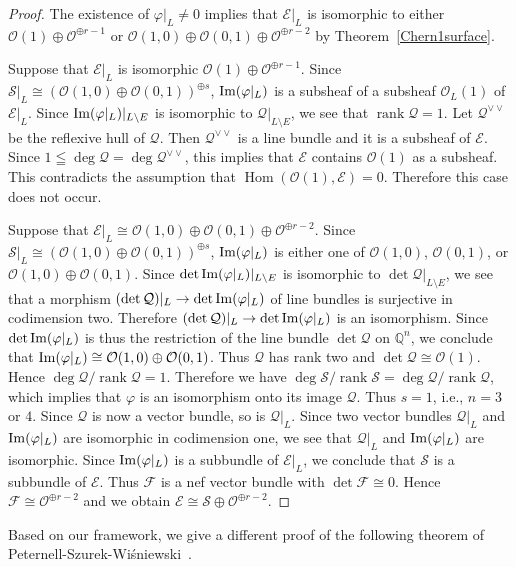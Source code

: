 \documentclass[a4paper,12pt]{amsart}
\newcommand{\im}{\mathop{\rm Im}\nolimits}
\DeclareMathOperator{\Hom}{Hom}
\DeclareMathOperator{\rk}{rank}
\begin{document}
\begin{proof}
The existence of $\varphi|_{L}\neq 0$ implies 
that $\mathcal{E}|_{L}$ is isomorphic to either $\mathcal{O}(1)\oplus \mathcal{O}^{\oplus r-1}$
or $\mathcal{O}(1,0)\oplus \mathcal{O}(0,1)\oplus \mathcal{O}^{\oplus r-2}$
by Theorem~\ref{Chern1surface}.

Suppose that 
$\mathcal{E}|_{L}$ is isomorphic $\mathcal{O}(1)\oplus \mathcal{O}^{\oplus r-1}$.
Since $\mathcal{S}|_{L}\cong (\mathcal{O}(1,0)\oplus \mathcal{O}(0,1))^{\oplus s}$,
$\im (\varphi|_{L})$ is a 
subsheaf of 
a subsheaf $\mathcal{O}_L(1)$ of $\mathcal{E}|_L$.
Since $\im (\varphi|_L)|_{L\setminus E}$ is isomorphic to $\mathcal{Q}|_{L\setminus E}$,
we see that $\rk \mathcal{Q}=1$.
Let $\mathcal{Q}^{\vee\vee}$ be the reflexive hull of $\mathcal{Q}$.
Then $\mathcal{Q}^{\vee\vee}$ is a line bundle 
and it is a subsheaf of $\mathcal{E}$.
Since 
$
1\leqq \deg\mathcal{Q}=\deg\mathcal{Q}^{\vee\vee}
$,
this implies that $\mathcal{E}$ contains $\mathcal{O}(1)$ as a subsheaf.
This contradicts the assumption that $\Hom(\mathcal{O}(1),\mathcal{E})=0$.
Therefore this case does not occur.

Suppose that 
$\mathcal{E}|_{L}
\cong 
\mathcal{O}(1,0)\oplus \mathcal{O}(0,1)\oplus \mathcal{O}^{\oplus r-2}$.
Since $\mathcal{S}|_{L}\cong (\mathcal{O}(1,0)\oplus \mathcal{O}(0,1))^{\oplus s}$,
$\im (\varphi|_{L})$ is either one of 
$\mathcal{O}(1,0)$, $\mathcal{O}(0,1)$,
or $\mathcal{O}(1,0)\oplus \mathcal{O}(0,1)$.
Since $\det \im (\varphi|_L)|_{L\setminus E}$ is isomorphic to $\det\mathcal{Q}|_{L\setminus E}$,
we see that a morphism  $(\det\mathcal{Q})|_{L}\to \det \im (\varphi|_L)$ of line bundles 
is surjective in codimension two.
Therefore $(\det\mathcal{Q})|_{L}\to \det \im (\varphi|_L)$ is an isomorphism.
Since $\det \im (\varphi|_L)$ is thus the restriction of the line bundle $\det\mathcal{Q}$ on $\mathbb{Q}^n$,
we conclude that $\im(\varphi|_{L})\cong \mathcal{O}(1,0)\oplus \mathcal{O}(0,1)$.
Thus $\mathcal{Q}$ has rank two and $\det\mathcal{Q}\cong\mathcal{O}(1)$.
Hence 
$
\deg\mathcal{Q}/\rk\mathcal{Q}=1
$.
Therefore
we have 
$
\deg\mathcal{S}/\rk\mathcal{S}= \deg\mathcal{Q}/\rk\mathcal{Q}
$,
which implies that $\varphi$ is an isomorphism onto its image $\mathcal{Q}$.
Thus $s=1$, i.e., $n=3$ or $4$.
Since $\mathcal{Q}$ is now a vector bundle, so is $\mathcal{Q}|_{L}$.
Since two vector bundles $\mathcal{Q}|_L$ and $\im (\varphi|_L)$ are isomorphic in codimension one,
we see that $\mathcal{Q}|_L$ and $\im (\varphi|_L)$ are isomorphic.
Since $\im (\varphi|_L)$ is a subbundle of $\mathcal{E}|_L$,
we conclude that $\mathcal{S}$ is a subbundle of $\mathcal{E}$.
Thus $\mathcal{F}$ is a nef vector bundle with $\det\mathcal{F}\cong 0$.
Hence $\mathcal{F}\cong \mathcal{O}^{\oplus r-2}$ and we obtain $\mathcal{E}\cong \mathcal{S}\oplus \mathcal{O}^{\oplus r-2}$.
\end{proof}
Based on our framework, we give a different proof of the following theorem of Peternell-Szurek-Wi\'{s}niewski~\cite[Theorem 2]{pswnef}.
\end{document}
